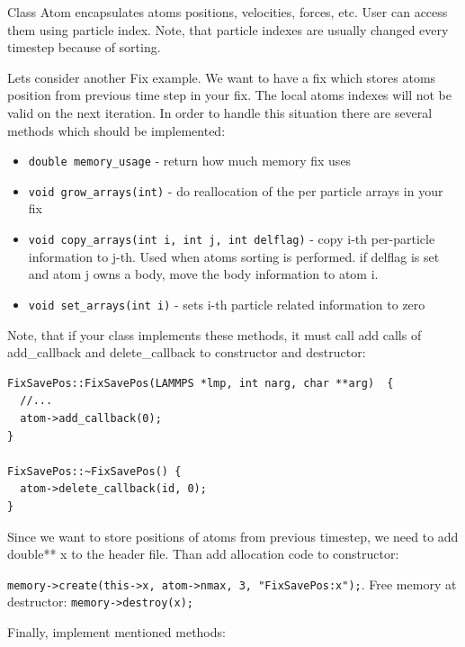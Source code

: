 \documentclass{article}
\begin{document}
Class Atom encapsulates atoms positions, velocities, forces, etc. User
can access them using particle index. Note, that particle indexes are
usually changed every timestep because of sorting.

Lets consider another Fix example. We want to have a fix which stores
atoms position from previous time step in your fix. The local atoms
indexes will not be valid on the next iteration. In order to handle
this situation there are several methods which should be implemented:

\begin{itemize}
\item \verb|double memory_usage| - return how much memory fix uses
\item \verb|void grow_arrays(int)| - do reallocation of the per particle arrays
  in your fix
\item \verb|void copy_arrays(int i, int j, int delflag)| - copy i-th per-particle
  information to j-th. Used when atoms sorting is performed. if delflag is set
  and atom j owns a body, move the body information to atom i.
\item \verb|void set_arrays(int i)| - sets i-th particle related information to zero
\end{itemize}

Note, that if your class implements these methods, it must call add calls of
add\_callback and delete\_callback to constructor and destructor:

\begin{center}
\begin{verbatim}
FixSavePos::FixSavePos(LAMMPS *lmp, int narg, char **arg)  {
  //...
  atom->add_callback(0);
}

FixSavePos::~FixSavePos() {
  atom->delete_callback(id, 0);
}
\end{verbatim}
\end{center}

Since we want to store positions of atoms from previous timestep, we
need to add double** x to the header file. Than add allocation code to
constructor:

\verb|memory->create(this->x, atom->nmax, 3, "FixSavePos:x");|. Free memory
at destructor: \verb|memory->destroy(x);|

Finally, implement mentioned methods:
\end{document}
